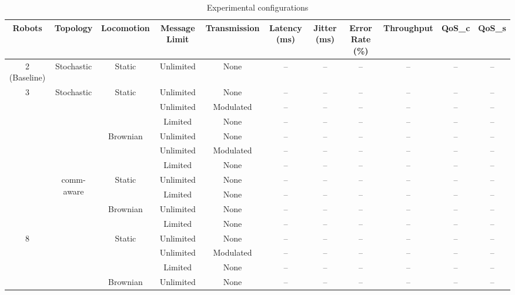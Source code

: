 \documentclass[conference]{IEEEtran}
\begin{document}
\renewcommand{\arraystretch}{0.9}  
\begin{table}[ht]
\scriptsize
\centering
\caption{Experimental configurations}
\label{tab:exp_config}
\begin{tabular}{c|c|c|c|c|c|c|c|c|c|c}
\toprule
\textbf{Robots} & \textbf{Topology} & \textbf{Locomotion} & \textbf{Message Limit} & \textbf{Transmission} & \textbf{Latency (ms)} & \textbf{Jitter (ms)} & \textbf{Error Rate (\%)} & \textbf{Throughput} & \textbf{QoS\_c} & \textbf{QoS\_s} \\
\midrule
2 (Baseline) & Stochastic & Static & Unlimited & None & -- & -- & -- & -- & -- & -- \\
\midrule
\multirow{10}{*}{3}
  & \multirow{5}{*}{Stochastic}
    & \multirow{2}{*}{Static}
                 & Unlimited & None      & -- & -- & -- & -- & -- & -- \\
  &   &          & Unlimited & Modulated & -- & -- & -- & -- & -- & -- \\
  &   &          & Limited   & None      & -- & -- & -- & -- & -- & -- \\
  \cmidrule{3-11}
  &   & \multirow{2}{*}{Brownian}
                 & Unlimited & None      & -- & -- & -- & -- & -- & -- \\
  &   &          & Unlimited & Modulated & -- & -- & -- & -- & -- & -- \\
  &   &          & Limited   & None      & -- & -- & -- & -- & -- & -- \\
  \cmidrule{2-11}
  & \multirow{5}{*}{comm-aware}
    & \multirow{2}{*}{Static}
                 & Unlimited & None      & -- & -- & -- & -- & -- & -- \\
  &   &          & Limited   & None      & -- & -- & -- & -- & -- & -- \\
  \cmidrule{3-11}
  &   & \multirow{2}{*}{Brownian}
                 & Unlimited & None      & -- & -- & -- & -- & -- & -- \\
  &   &          & Limited   & None      & -- & -- & -- & -- & -- & -- \\
\midrule
\multirow{10}{*}{8}
  & \multirow{5}{*}{Stochastic}
    & \multirow{2}{*}{Static}
                 & Unlimited & None      & -- & -- & -- & -- & -- & -- \\
  &   &          & Unlimited & Modulated & -- & -- & -- & -- & -- & -- \\
  &   &          & Limited   & None      & -- & -- & -- & -- & -- & -- \\
  \cmidrule{3-11}
  &   & \multirow{2}{*}{Brownian}
                 & Unlimited & None      & -- & -- & -- & -- & -- & -- \\

\end{tabular}
\end{table}
\end{document}
